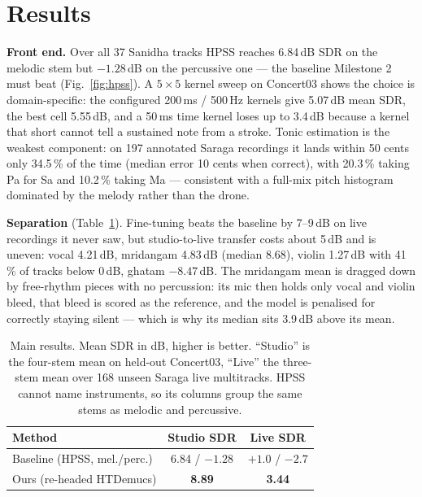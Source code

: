 \documentclass[11pt,a4paper,twocolumn]{article}
\begin{document}
\section{Results}
\textbf{Front end.} Over all 37 Sanidha tracks HPSS reaches 6.84\,dB SDR on the melodic stem but
$-1.28$\,dB on the percussive one --- the baseline Milestone 2 must beat (Fig.~\ref{fig:hpss}). A
$5\times5$ kernel sweep on Concert03 shows the choice is domain-specific: the configured 200\,ms /
500\,Hz kernels give 5.07\,dB mean SDR, the best cell 5.55\,dB, and a 50\,ms time kernel loses up
to 3.4\,dB because a kernel that short cannot tell a sustained note from a stroke. Tonic
estimation is the weakest component: on 197 annotated Saraga recordings it lands within 50 cents
only 34.5\,\% of the time (median error 10 cents when correct), with 20.3\,\% taking Pa for Sa and
10.2\,\% taking Ma --- consistent with a full-mix pitch histogram dominated by the melody rather
than the drone.

\textbf{Separation} (Table~\ref{tab:results}). Fine-tuning beats the baseline by 7--9\,dB on live
recordings it never saw, but studio-to-live transfer costs about 5\,dB and is uneven: vocal
4.21\,dB, mridangam 4.83\,dB (median 8.68), violin 1.27\,dB with 41\,\% of tracks below 0\,dB,
ghatam $-8.47$\,dB. The mridangam mean is dragged down by free-rhythm pieces with no percussion:
its mic then holds only vocal and violin bleed, that bleed is scored as the reference, and the
model is penalised for correctly staying silent --- which is why its median sits 3.9\,dB above its
mean.

\begin{table}[h]
\centering
\small
\begin{tabular}{lcc}
\toprule
Method & Studio SDR & Live SDR \\
\midrule
Baseline (HPSS, mel./perc.) & 6.84 / $-1.28$ & $+1.0$ / $-2.7$ \\
Ours (re-headed HTDemucs) & \textbf{8.89} & \textbf{3.44} \\
\bottomrule
\end{tabular}
\caption{Main results. Mean SDR in dB, higher is better. ``Studio'' is the four-stem mean on
held-out Concert03, ``Live'' the three-stem mean over 168 unseen Saraga live multitracks. HPSS
cannot name instruments, so its columns group the same stems as melodic and percussive.}
\label{tab:results}
\end{table}
\end{document}
